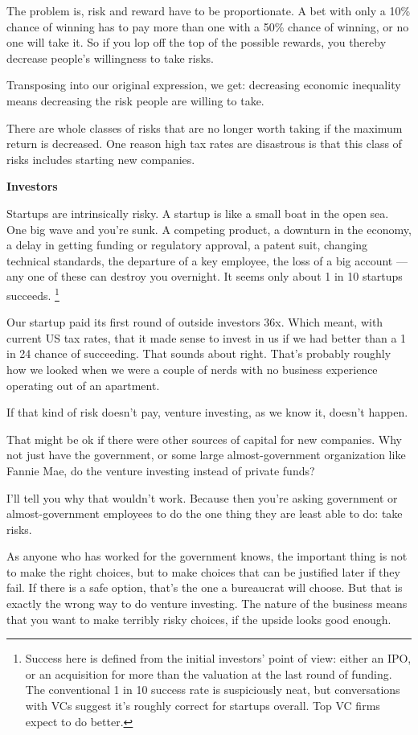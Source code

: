 \documentclass[12pt]{book}
\begin{document}
The problem is, risk and reward have to be proportionate. A bet with
only a 10\% chance of winning has to pay more than one with a 50\%
chance of winning, or no one will take it. So if you lop off the top of
the possible rewards, you thereby decrease people's willingness to take
risks.

Transposing into our original expression, we get: decreasing economic
inequality means decreasing the risk people are willing to take.

There are whole classes of risks that are no longer worth taking if the
maximum return is decreased. One reason high tax rates are disastrous is
that this class of risks includes starting new companies.

\textbf{Investors}

Startups are intrinsically risky. A startup is like a small boat in the
open sea. One big wave and you're sunk. A competing product, a downturn
in the economy, a delay in getting funding or regulatory approval, a
patent suit, changing technical standards, the departure of a key
employee, the loss of a big account --- any one of these can destroy you
overnight. It seems only about 1 in 10 startups succeeds.
\footnote{Success here is defined from the initial investors' point of
view: either an IPO, or an acquisition for more than the valuation at
the last round of funding. The conventional 1 in 10 success rate is
suspiciously neat, but conversations with VCs suggest it's roughly
correct for startups overall. Top VC firms expect to do better.}

Our startup paid its first round of outside investors 36x. Which meant,
with current US tax rates, that it made sense to invest in us if we had
better than a 1 in 24 chance of succeeding. That sounds about right.
That's probably roughly how we looked when we were a couple of nerds
with no business experience operating out of an apartment.

If that kind of risk doesn't pay, venture investing, as we know it,
doesn't happen.

That might be ok if there were other sources of capital for new
companies. Why not just have the government, or some large
almost-government organization like Fannie Mae, do the venture investing
instead of private funds?

I'll tell you why that wouldn't work. Because then you're asking
government or almost-government employees to do the one thing they are
least able to do: take risks.

As anyone who has worked for the government knows, the important thing
is not to make the right choices, but to make choices that can be
justified later if they fail. If there is a safe option, that's the one
a bureaucrat will choose. But that is exactly the wrong way to do
venture investing. The nature of the business means that you want to
make terribly risky choices, if the upside looks good enough.
\end{document}
